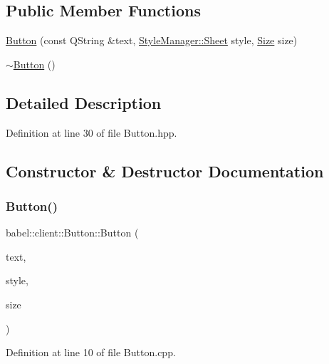 \subsection*{Public Member Functions}
\begin{DoxyCompactItemize}
\item 
\mbox{\hyperlink{classbabel_1_1client_1_1_button_ab16b9acecd816d2b510cda7df78a1b12}{Button}} (const Q\+String \&text, \mbox{\hyperlink{classbabel_1_1client_1_1_style_manager_a187dbf4a4f46c89dd5119496eb2fda52}{Style\+Manager\+::\+Sheet}} style, \mbox{\hyperlink{class_size}{Size}} size)
\item 
\mbox{\hyperlink{classbabel_1_1client_1_1_button_a2d571e0f4bd0ca7ab21ea1cf304d6335}{$\sim$\+Button}} ()
\end{DoxyCompactItemize}


\subsection{Detailed Description}


Definition at line 30 of file Button.\+hpp.



\subsection{Constructor \& Destructor Documentation}
\mbox{\label{classbabel_1_1client_1_1_button_ab16b9acecd816d2b510cda7df78a1b12}} 
\subsubsection{\texorpdfstring{Button()}{Button()}}
{\footnotesize\ttfamily babel\+::client\+::\+Button\+::\+Button (\begin{DoxyParamCaption}\item[{const Q\+String \&}]{text,  }\item[{\mbox{\hyperlink{classbabel_1_1client_1_1_style_manager_a187dbf4a4f46c89dd5119496eb2fda52}{Style\+Manager\+::\+Sheet}}}]{style,  }\item[{\mbox{\hyperlink{class_size}{Size}}}]{size }\end{DoxyParamCaption})}



Definition at line 10 of file Button.\+cpp.

